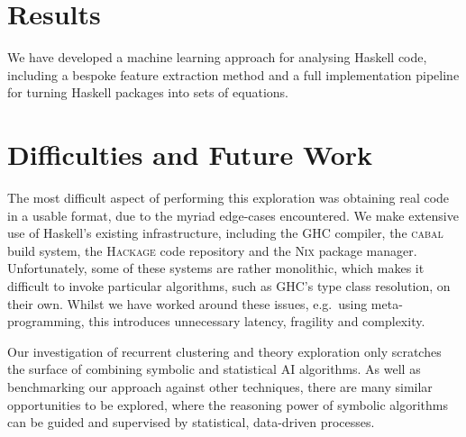 \documentclass[]{default}
\begin{document}
\section{Results}\label{results}

We have developed a machine learning approach for analysing Haskell code, including a
bespoke feature extraction method and a full implementation pipeline for turning Haskell packages into sets of equations.

\section{Difficulties and Future Work}\label{future-work}

The most difficult aspect of performing this exploration was obtaining real code in a usable format, due to the myriad edge-cases encountered. We make extensive use of Haskell's existing infrastructure, including the \textsc{GHC} compiler, the \textsc{cabal} build system, the \textsc{Hackage} code repository and the \textsc{Nix} package manager. Unfortunately, some of these systems are rather monolithic, which makes it difficult to invoke particular algorithms, such as \textsc{GHC}'s type class resolution, on their own. Whilst we have worked around these issues, e.g.\ using meta-programming, this introduces unnecessary latency, fragility and complexity.

Our investigation of recurrent clustering and theory exploration only scratches the surface of combining symbolic and statistical AI algorithms. As well as benchmarking our approach against other techniques, there are many similar opportunities to be explored, where the reasoning power of symbolic algorithms can be guided and supervised by statistical, data-driven processes.



\end{document}
